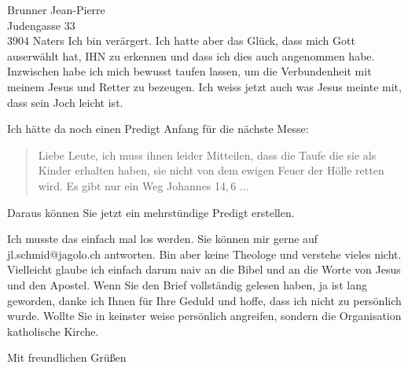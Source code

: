 \documentclass[
    12pt,
    a4paper,
    letter,
    parskip=yes,
    ]{scrlttr2}
\begin{document}
\begin{letter}{
Brunner Jean-Pierre\\
Judengasse 33\\
3904 Naters}
Ich bin verärgert. Ich hatte aber das Glück, dass mich Gott auserwählt hat, IHN zu erkennen und dass ich dies auch angenommen habe. Inzwischen habe ich mich bewusst taufen lassen, um die Verbundenheit mit meinem Jesus und Retter zu bezeugen. Ich weiss jetzt auch was Jesus meinte mit, dass sein Joch leicht ist. 


Ich hätte da noch einen Predigt Anfang für die nächste Messe:
\begin{quote}
    Liebe Leute, ich muss ihnen leider Mitteilen, dass die Taufe die sie als Kinder erhalten haben, sie nicht von dem ewigen Feuer der Hölle retten wird. Es gibt nur ein Weg Johannes 14,\,6
    ...
\end{quote}
Daraus können Sie jetzt ein mehrstündige Predigt erstellen.


Ich musste das einfach mal los werden. Sie können mir gerne auf jl.schmid@jagolo.ch antworten. Bin aber keine Theologe und verstehe vieles nicht. Vielleicht glaube ich einfach darum naiv an die Bibel und an die Worte von Jesus und den Apostel. 
Wenn Sie den Brief vollständig gelesen haben, ja ist lang geworden, danke ich Ihnen für Ihre Geduld und hoffe, dass ich nicht zu persönlich wurde. Wollte Sie in keinster weise persönlich angreifen, sondern die Organisation katholische Kirche.


\closing{Mit freundlichen Grüßen}
\end{letter}
\end{document}
